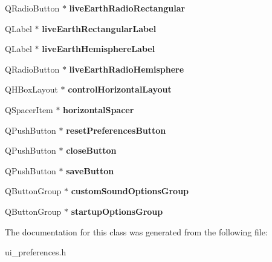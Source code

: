 \begin{DoxyCompactItemize}
\item 
\hypertarget{classUi__Preferences_ace264d1e3cdc0323fc42af478d237474}{
QRadioButton $\ast$ {\bfseries liveEarthRadioRectangular}}
\label{classUi__Preferences_ace264d1e3cdc0323fc42af478d237474}

\item 
\hypertarget{classUi__Preferences_aecbe1aff951c2db302cafc5fa1a360d3}{
QLabel $\ast$ {\bfseries liveEarthRectangularLabel}}
\label{classUi__Preferences_aecbe1aff951c2db302cafc5fa1a360d3}

\item 
\hypertarget{classUi__Preferences_a3df3e087ec1aad1431fdf2f3094ab18f}{
QLabel $\ast$ {\bfseries liveEarthHemisphereLabel}}
\label{classUi__Preferences_a3df3e087ec1aad1431fdf2f3094ab18f}

\item 
\hypertarget{classUi__Preferences_a36bc1ebcafd8d193a799520bf4f3e3e1}{
QRadioButton $\ast$ {\bfseries liveEarthRadioHemisphere}}
\label{classUi__Preferences_a36bc1ebcafd8d193a799520bf4f3e3e1}

\item 
\hypertarget{classUi__Preferences_a3a480e79aca097cfe6d379adb40e520f}{
QHBoxLayout $\ast$ {\bfseries controlHorizontalLayout}}
\label{classUi__Preferences_a3a480e79aca097cfe6d379adb40e520f}

\item 
\hypertarget{classUi__Preferences_a09701ca4cfd864456cd57537ff8f1dff}{
QSpacerItem $\ast$ {\bfseries horizontalSpacer}}
\label{classUi__Preferences_a09701ca4cfd864456cd57537ff8f1dff}

\item 
\hypertarget{classUi__Preferences_aa567cb947008e6d473f92fe94070d29b}{
QPushButton $\ast$ {\bfseries resetPreferencesButton}}
\label{classUi__Preferences_aa567cb947008e6d473f92fe94070d29b}

\item 
\hypertarget{classUi__Preferences_a63355e36bb93c452d4a383bb77260a7f}{
QPushButton $\ast$ {\bfseries closeButton}}
\label{classUi__Preferences_a63355e36bb93c452d4a383bb77260a7f}

\item 
\hypertarget{classUi__Preferences_ae4ec3c79a28a3832734f67045576804e}{
QPushButton $\ast$ {\bfseries saveButton}}
\label{classUi__Preferences_ae4ec3c79a28a3832734f67045576804e}

\item 
\hypertarget{classUi__Preferences_a0cb2fcb5f3ae47ee18b9e90be0d88656}{
QButtonGroup $\ast$ {\bfseries customSoundOptionsGroup}}
\label{classUi__Preferences_a0cb2fcb5f3ae47ee18b9e90be0d88656}

\item 
\hypertarget{classUi__Preferences_a675b828e13ef715d551de75d9f1d9aa7}{
QButtonGroup $\ast$ {\bfseries startupOptionsGroup}}
\label{classUi__Preferences_a675b828e13ef715d551de75d9f1d9aa7}

\end{DoxyCompactItemize}


The documentation for this class was generated from the following file:\begin{DoxyCompactItemize}
\item 
ui\_\-preferences.h\end{DoxyCompactItemize}
